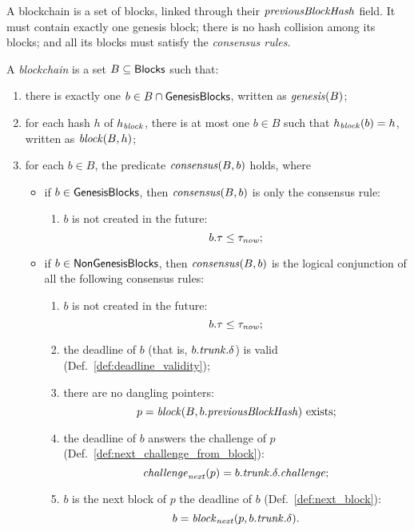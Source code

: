 A blockchain is a set of blocks, linked through their ${\mathit{previousBlockHash}}$ field.
It must contain exactly one genesis block; there is no hash collision among its blocks;
and all its blocks must satisfy the \emph{consensus rules}.
%
\begin{definition}\label{def:blockchain}
  A \emph{blockchain} is a set $B\subseteq{\mathsf{Blocks}}$ such that:
  \begin{enumerate}
  \item\label{prop:blockchain:genesis} there is exactly one $b\in B\cap{\mathsf{GenesisBlocks}}$, written as ${\mathit{genesis}}(B)$;
  \item\label{prop:blockchain:no_collision} for each hash $h$ of $h_{\mathit{block}}$, there is at most
    one $b\in B$ such that $h_{\mathit{block}}(b)=h$, written as ${\mathit{block}}(B,h)$;
  \item\label{prop:blockchain:consensus} for each $b\in B$, the predicate ${\mathit{consensus}}(B,b)$ holds, where
    \begin{itemize}
    \item if $b\in{\mathsf{GenesisBlocks}}$, then ${\mathit{consensus}}(B,b)$ is only the consensus rule:
      \begin{enumerate}[label=(\alph*)]
      \item $b$ is not created in the future:
        \[
        b.\tau\le\tau_{\mathit{now}};
        \]
      \end{enumerate}
    \item if $b\in{\mathsf{NonGenesisBlocks}}$, then ${\mathit{consensus}}(B,b)$ is the logical conjunction
      of all the following consensus rules:
      \begin{enumerate}[label=(\alph*)]
      \item\label{prop:consensus:no_future} $b$ is not created in the future:
        \[
        b.\tau\le\tau_{\mathit{now}};
        \]
      \item\label{prop:consensus:valid} the deadline of $b$ (that is, $b.{\mathit{trunk}}.\delta$) is valid (Def.~\ref{def:deadline_validity});
      \item\label{prop:consensus:no_dangling} there are no dangling pointers:
        \[
        p={\mathit{block}}(B,b.{\mathit{previousBlockHash}})\text{ exists;}
        \]
      \item\label{prop:consensus:answer} the deadline of $b$ answers the challenge of $p$ (Def.~\ref{def:next_challenge_from_block}):
        \[
        {\mathit{challenge}}_{\mathit{next}}(p)=b.{\mathit{trunk}}.\delta.{\mathit{challenge}};
        \]
      \item\label{prop:consensus:next_block} $b$ is the next block of $p$ \wrt the deadline of $b$ (Def.~\ref{def:next_block}):
        \[
        b={\mathit{block}}_{\mathit{next}}(p,b.{\mathit{trunk}}.\delta).
        \]
      \end{enumerate}
    \end{itemize}
  \end{enumerate}
\end{definition}
